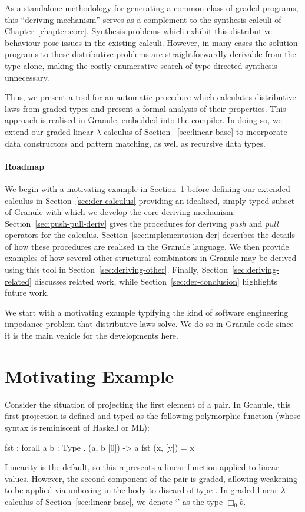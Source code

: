 As a standalone methodology for generating a common class of graded programs,
this ``deriving mechanism'' serves as a complement to the synthesis calculi of
Chapter~\ref{chapter:core}. Synthesis problems which exhibit this distributive
behaviour pose issues in the existing calculi. However, in many cases the
solution programs to these distributive problems are straightforwardly derivable
from the type alone, making the costly enumerative search of type-directed synthesis
unnecessary.

Thus, we present a tool for an automatic procedure which calculates distributive
laws from graded types and present a formal analysis of their properties. This
approach is realised in Granule, embedded into the compiler. In doing so, we 
extend our graded linear $\lambda$-calculus of Section
~\ref{sec:linear-base} to incorporate data constructors and pattern matching, as well 
as recursive data types. 

\paragraph{Roadmap} We begin with a motivating example in Section~\ref{sec:motivating-example}
before defining our extended calculus in Section~\ref{sec:der-calculus}
providing an idealised, simply-typed subset of Granule with which we develop the
core deriving mechanism. Section~\ref{sec:push-pull-deriv} gives the procedures
for deriving \emph{push} and \emph{pull} operators for the calculus.
Section~\ref{sec:implementation-der} describes the details of how these
procedures are realised in the Granule language. We then provide examples of how
several other structural combinators in Granule may be derived using this tool
in Section~\ref{sec:deriving-other}. Finally, Section~\ref{sec:deriving-related}
discusses related work, while Section~\ref{sec:der-conclusion} highlights future
work.

We start with a motivating example typifying the kind of software engineering
impedance problem that distributive laws solve. We do so in Granule code since
it is the main vehicle for the developments here.

\section{Motivating Example}
\label{sec:motivating-example}

Consider the situation of projecting the first element of a pair. In Granule,
this first-projection is defined and typed as the following polymorphic function
(whose syntax is reminiscent of Haskell or ML):
%
\begin{granule}
fst : forall { a b : Type } . (a, b [0]) -> a
fst (x, [y]) = x
\end{granule}
%
Linearity is the default, so this represents a linear function applied to linear
values. However, the second component of the pair is graded, allowing weakening
to be applied via unboxing in the body to discard  of type .
In graded linear $\lambda$-calculus of Section~\ref{sec:linear-base}, we denote `' as the
type $\Box_0 b$.

